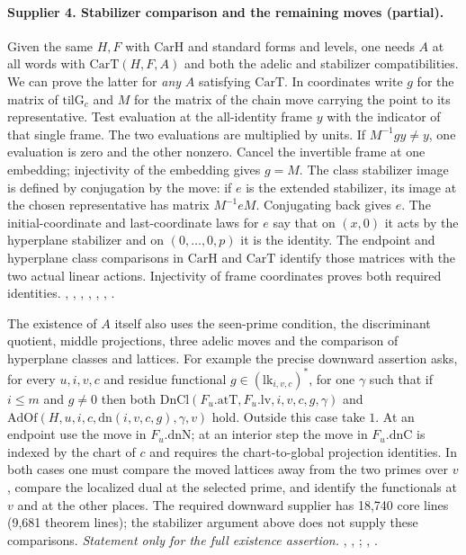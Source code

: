\paragraph{Supplier 4. Stabilizer comparison and the remaining moves (partial).}
Given the same $H,F$ with $\mathrm{CarH}$ and standard forms and levels,
one needs $A$ at all words with $\mathrm{CarT}(H,F,A)$ and both the
adelic and stabilizer compatibilities. We can prove the latter for
\emph{any} $A$ satisfying $\mathrm{CarT}$. In coordinates write $g$
for the matrix of $\mathrm{tilG}_c$ and $M$ for the matrix of the
chain move carrying the point to its representative. Test evaluation
at the all-identity frame $y$ with the indicator of that single frame.
The two evaluations are multiplied by units. If $M^{-1}gy\ne y$,
one evaluation is zero and the other nonzero. Cancel the invertible
frame at one embedding; injectivity of the embedding gives $g=M$.
The class stabilizer image is defined by conjugation by the move:
if $e$ is the extended stabilizer, its image at the chosen representative
has matrix $M^{-1}eM$. Conjugating back gives $e$. The initial-coordinate
and last-coordinate laws for $e$ say that on $(x,0)$ it acts by the
hyperplane stabilizer and on $(0,\ldots,0,p)$ it is the identity.
The endpoint and hyperplane class comparisons in $\mathrm{CarH}$ and
$\mathrm{CarT}$ identify those matrices with the two actual linear
actions. Injectivity of frame coordinates proves both required identities.
, , ,
, , ,
.

The existence of $A$ itself also uses the seen-prime condition, the
discriminant quotient, middle projections, three adelic moves and the
comparison of hyperplane classes and lattices. For example the precise
downward assertion asks, for every $u,i,v,c$ and residue functional
$g\in(\mathrm{lk}_{i,v,c})^*$, for one $\gamma$ such that if $i\le m$ and
$g\ne0$ then both $\mathrm{DnCl}(F_u.\mathrm{atT},F_u.\mathrm{lv},i,v,c,g,\gamma)$
and $\mathrm{AdOf}(H,u,i,c,\mathrm{dn}(i,v,c,g),\gamma,v)$ hold.
Outside this case take $1$. At an endpoint use the move in $F_u.\mathrm{dnN}$;
at an interior step the move in $F_u.\mathrm{dnC}$ is indexed by the
chart of $c$ and requires the chart-to-global projection identities.
In both cases one must compare the moved lattices away from the two
primes over $v$, compare the localized dual at the selected prime,
and identify the functionals at $v$ and at the other places.
The required downward supplier has 18,740 core lines (9,681 theorem
lines); the stabilizer argument above does not supply these comparisons.
\emph{Statement only for the full existence assertion.}
, ,
;
, .



